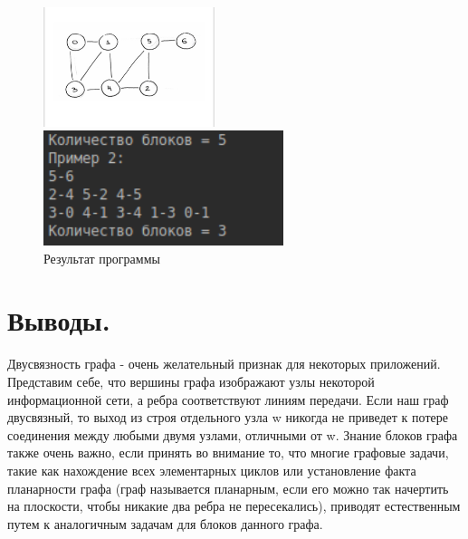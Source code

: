 \documentclass[12pt,a4paper]{scrartcl}
\begin{document}
\begin{figure}[h]
	\begin{multicols}{2}
		\hfill
		\includegraphics[width=50mm]{graph2.jpg}
		\hfill
		\caption{Граф из Примера 2}
		\hfill
		\includegraphics[width=70mm]{ex2.png}
		\hfill
		\caption{Результат программы}
	\end{multicols}
\end{figure}

\section{Выводы.}
 Двусвязность графа - очень желательный признак для некоторых приложений. Представим себе, что вершины графа изображают узлы некоторой информационной сети, а ребра соответствуют линиям передачи. Если наш граф двусвязный, то выход из строя отдельного узла w никогда не приведет к потере соединения между любыми двумя узлами, отличными от w. Знание блоков графа также очень важно, если принять во внимание то, что многие графовые задачи, такие как нахождение всех элементарных циклов или установление факта планарности графа (граф называется планарным, если его можно так начертить на плоскости, чтобы никакие два ребра не пересекались), приводят естественным путем к аналогичным задачам для блоков данного графа.
\end{document}
